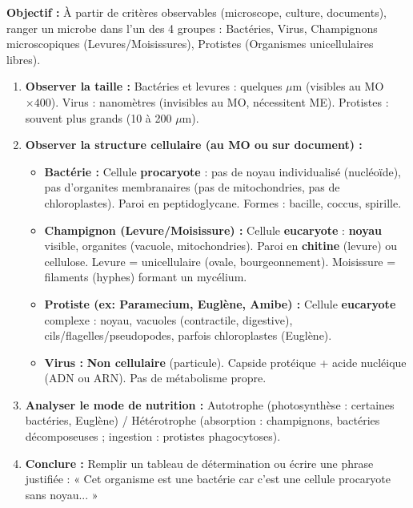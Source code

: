 \documentclass[11pt]{article}
\begin{document}
\begin{methode}
    \textbf{Objectif :} À partir de critères observables (microscope, culture, documents), ranger un microbe dans l'un des 4 groupes : Bactéries, Virus, Champignons microscopiques (Levures/Moisissures), Protistes (Organismes unicellulaires libres).
    \begin{enumerate}
        \item \textbf{Observer la taille :} Bactéries et levures : quelques $\mu$m (visibles au MO $\times 400$). Virus : nanomètres (invisibles au MO, nécessitent ME). Protistes : souvent plus grands (10 à 200 $\mu$m).
        \item \textbf{Observer la structure cellulaire (au MO ou sur document) :}
            \begin{itemize}
                \item \textbf{Bactérie :} Cellule \textbf{procaryote} : pas de noyau individualisé (nucléoïde), pas d'organites membranaires (pas de mitochondries, pas de chloroplastes). Paroi en peptidoglycane. Formes : bacille, coccus, spirille.
                \item \textbf{Champignon (Levure/Moisissure) :} Cellule \textbf{eucaryote} : \textbf{noyau} visible, organites (vacuole, mitochondries). Paroi en \textbf{chitine} (levure) ou cellulose. Levure = unicellulaire (ovale, bourgeonnement). Moisissure = filaments (hyphes) formant un mycélium.
                \item \textbf{Protiste (ex: Paramecium, Euglène, Amibe) :} Cellule \textbf{eucaryote} complexe : noyau, vacuoles (contractile, digestive), cils/flagelles/pseudopodes, parfois chloroplastes (Euglène).
                \item \textbf{Virus :} \textbf{Non cellulaire} (particule). Capside protéique + acide nucléique (ADN ou ARN). Pas de métabolisme propre.
            \end{itemize}
        \item \textbf{Analyser le mode de nutrition :} Autotrophe (photosynthèse : certaines bactéries, Euglène) / Hétérotrophe (absorption : champignons, bactéries décomposeuses ; ingestion : protistes phagocytoses).
        \item \textbf{Conclure :} Remplir un tableau de détermination ou écrire une phrase justifiée : « Cet organisme est une bactérie car c'est une cellule procaryote sans noyau... »
    \end{enumerate}
\end{methode}
\end{document}
